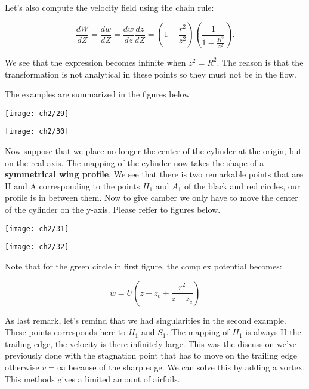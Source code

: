 \documentclass[british,french,11pt, a4paper, openany]{article}
\begin{document}
Let's also compute the velocity field using the chain rule:

\begin{equation}
\frac{dW}{dZ} = \frac{dw}{dZ} = \frac{dw}{dz}\frac{dz}{dZ} = \left( 1 -\frac{r^2}{z^2} \right) \left( \frac{1}{1-\frac{R^2}{z^2}} \right).
\end{equation}

We see that the expression becomes infinite when $z^2 = R^2$. The reason is that the transformation is not analytical in these points so they must not be in the flow. 

The examples are summarized in the figures below 

\begin{center}
	\begin{minipage}{0.45\textwidth}
		\texttt{[image: ch2/29]}
	\end{minipage}
	\begin{minipage}{0.45\textwidth}
		\texttt{[image: ch2/30]}
	\end{minipage}
\end{center}

Now suppose that we place no longer the center of the cylinder at the origin, but on the real axis. The mapping of the cylinder now takes the shape of a \textbf{symmetrical wing profile}. We see that there is two remarkable points that are H and A corresponding to the points $H_1$ and $A_1$ of the black and red circles, our profile is in between them. Now to give camber we only have to move the center of the cylinder on the y-axis. Please reffer to figures below. 

\begin{center}
	\begin{minipage}{0.45\textwidth}
		\texttt{[image: ch2/31]}
	\end{minipage}
	\begin{minipage}{0.45\textwidth}
		\texttt{[image: ch2/32]}
	\end{minipage}
\end{center}

Note that for the green circle in first figure, the complex potential becomes:

\begin{equation}
w = U\left( z-z_c + \frac{r^2}{z-z_c} \right)
\end{equation}

As last remark, let's remind that we had singularities in the second example. These points corresponds here to $H_1$ and $S_1$. The mapping of $H_1$ is always H the trailing edge, the velocity is there infinitely large. This was the discussion we've previously done with the stagnation point that has to move on the trailing edge otherwise $v = \infty$ because of the sharp edge. We can solve this by adding a vortex. This methods gives a limited amount of airfoils.
\end{document}
